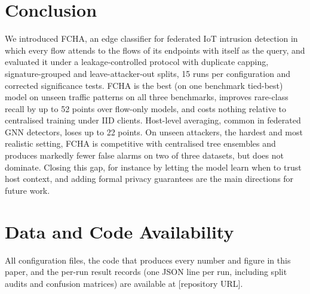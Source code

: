 \documentclass[journal]{IEEEtran}
\begin{document}
\section{Conclusion}
We introduced FCHA, an edge classifier for federated IoT intrusion detection in which every flow attends to the flows of its endpoints with itself as the query, and evaluated it under a leakage-controlled protocol with duplicate capping, signature-grouped and leave-attacker-out splits, 15 runs per configuration and corrected significance tests. FCHA is the best (on one benchmark tied-best) model on unseen traffic patterns on all three benchmarks, improves rare-class recall by up to 52 points over flow-only models, and costs nothing relative to centralised training under IID clients. Host-level averaging, common in federated GNN detectors, loses up to 22 points. On unseen attackers, the hardest and most realistic setting, FCHA is competitive with centralised tree ensembles and produces markedly fewer false alarms on two of three datasets, but does not dominate. Closing this gap, for instance by letting the model learn when to trust host context, and adding formal privacy guarantees are the main directions for future work.

\section*{Data and Code Availability}
All configuration files, the code that produces every number and figure in this paper, and the per-run result records (one JSON line per run, including split audits and confusion matrices) are available at [repository URL].
\end{document}
